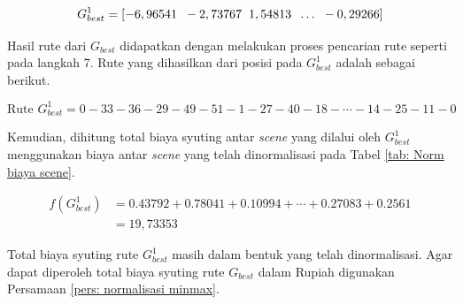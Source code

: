 {{\begin{enumerate}[align = left, left = 0cm, nolistsep]
\begin{enumerate}[label = (\alph*), align = left, left = 0cm, nolistsep]
                        \begin{equation*}
                            G_{best}^{1} = [-6,96541\hspace{2mm}	-2,73767\hspace{2mm}	1,54813\hspace{2mm}  \dots\hspace{2mm} -0,29266                        ]
                        \end{equation*}

                        Hasil rute dari $G_{best}$ didapatkan dengan melakukan proses pencarian rute seperti pada langkah 7.
                        Rute yang dihasilkan dari posisi pada $G_{best}^{1}$ adalah sebagai berikut.

                        \begin{equation*}
                            \text{Rute } G_{best}^{1} = 0-33-36-29-49-51-1-27-40-18- \cdots -14-25-11-0
                        \end{equation*}

                        Kemudian, dihitung total biaya syuting antar \textit{scene} yang dilalui oleh $G_{best}^{1}$ menggunakan biaya antar \textit{scene} yang telah dinormalisasi pada Tabel \ref{tab: Norm biaya scene}.

                        \begin{equation*}
                            \begin{aligned}
                                f(G_{best}^{1}) & = 0.43792 + 0.78041 + 0.10994 +  \cdots + 0.27083 + 0.2561 \\
                                                & = 19,73353
                            \end{aligned}
                        \end{equation*}

                        Total biaya syuting rute $G_{best}^{1}$ masih dalam bentuk yang telah dinormalisasi.
                        Agar dapat diperoleh total biaya syuting rute $G_{best}$ dalam Rupiah digunakan Persamaan \ref{pers: normalisasi minmax}.


\end{enumerate}
\end{enumerate}}}
